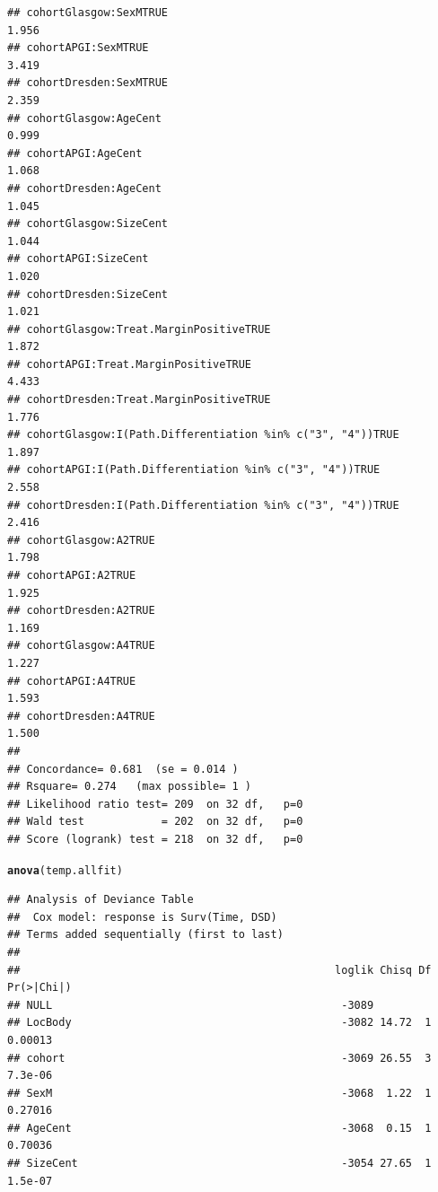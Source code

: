 \documentclass{article}\usepackage[]{graphicx}\usepackage[]{color}
\makeatletter
\newcommand{\hlstd}[1]{\textcolor[rgb]{0.345,0.345,0.345}{#1}}%
\newcommand{\hlkwd}[1]{\textcolor[rgb]{0.737,0.353,0.396}{\textbf{#1}}}%
\newenvironment{kframe}{%
 \def\at@end@of@kframe{}%
 \ifinner\ifhmode%
  \def\at@end@of@kframe{\end{minipage}}%
  \begin{minipage}{\columnwidth}%
 \fi\fi%
 \def\FrameCommand##1{\hskip\@totalleftmargin \hskip-\fboxsep
 \colorbox{shadecolor}{##1}\hskip-\fboxsep
     \hskip-\linewidth \hskip-\@totalleftmargin \hskip\columnwidth}%
 \MakeFramed {\advance\hsize-\width
   \@totalleftmargin\z@ \linewidth\hsize
   \@setminipage}}%
 {\par\unskip\endMakeFramed%
 \at@end@of@kframe}
\newenvironment{knitrout}{}{} %
\makeatother
\begin{document}
\begin{knitrout}
\begin{kframe}
\begin{verbatim}
## cohortGlasgow:SexMTRUE                                         1.956
## cohortAPGI:SexMTRUE                                            3.419
## cohortDresden:SexMTRUE                                         2.359
## cohortGlasgow:AgeCent                                          0.999
## cohortAPGI:AgeCent                                             1.068
## cohortDresden:AgeCent                                          1.045
## cohortGlasgow:SizeCent                                         1.044
## cohortAPGI:SizeCent                                            1.020
## cohortDresden:SizeCent                                         1.021
## cohortGlasgow:Treat.MarginPositiveTRUE                         1.872
## cohortAPGI:Treat.MarginPositiveTRUE                            4.433
## cohortDresden:Treat.MarginPositiveTRUE                         1.776
## cohortGlasgow:I(Path.Differentiation %in% c("3", "4"))TRUE     1.897
## cohortAPGI:I(Path.Differentiation %in% c("3", "4"))TRUE        2.558
## cohortDresden:I(Path.Differentiation %in% c("3", "4"))TRUE     2.416
## cohortGlasgow:A2TRUE                                           1.798
## cohortAPGI:A2TRUE                                              1.925
## cohortDresden:A2TRUE                                           1.169
## cohortGlasgow:A4TRUE                                           1.227
## cohortAPGI:A4TRUE                                              1.593
## cohortDresden:A4TRUE                                           1.500
## 
## Concordance= 0.681  (se = 0.014 )
## Rsquare= 0.274   (max possible= 1 )
## Likelihood ratio test= 209  on 32 df,   p=0
## Wald test            = 202  on 32 df,   p=0
## Score (logrank) test = 218  on 32 df,   p=0
\end{verbatim}
\begin{alltt}
\hlkwd{anova}\hlstd{(temp.allfit)}
\end{alltt}
\begin{verbatim}
## Analysis of Deviance Table
##  Cox model: response is Surv(Time, DSD)
## Terms added sequentially (first to last)
## 
##                                                 loglik Chisq Df Pr(>|Chi|)
## NULL                                             -3089                    
## LocBody                                          -3082 14.72  1    0.00013
## cohort                                           -3069 26.55  3    7.3e-06
## SexM                                             -3068  1.22  1    0.27016
## AgeCent                                          -3068  0.15  1    0.70036
## SizeCent                                         -3054 27.65  1    1.5e-07

\end{verbatim}
\end{kframe}
\end{knitrout}
\end{document}
